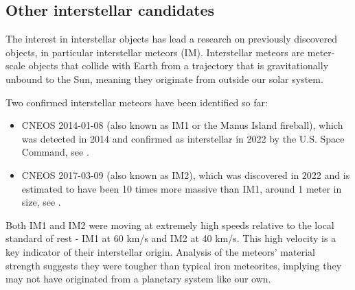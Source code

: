 \subsection{Other interstellar candidates}

The interest in interstellar objects has lead a research on previously
discovered objects, in particular interstellar meteors (IM). Interstellar
meteors are meter-scale objects that collide with Earth from a trajectory that
is gravitationally unbound to the Sun, meaning they originate from outside our
solar system.

Two confirmed interstellar meteors have been identified so far:

\begin{itemize}
  \item CNEOS 2014-01-08 (also known as IM1 or the Manus Island fireball), which
        was detected in 2014 and confirmed as interstellar in 2022 by the U.S. Space
        Command, see \cite{siraj2022}.
  \item CNEOS 2017-03-09 (also known as IM2), which was discovered in 2022 and is
        estimated to have been 10 times more massive than IM1, around 1 meter in
        size, see \cite{eloy2022char}.
\end{itemize}

Both IM1 and IM2 were moving at extremely high speeds relative to the local
standard of rest - IM1 at 60 km/s and IM2 at 40 km/s. This high velocity is a
key indicator of their interstellar origin. Analysis of the meteors' material
strength suggests they were tougher than typical iron meteorites, implying they
may not have originated from a planetary system like our own.
